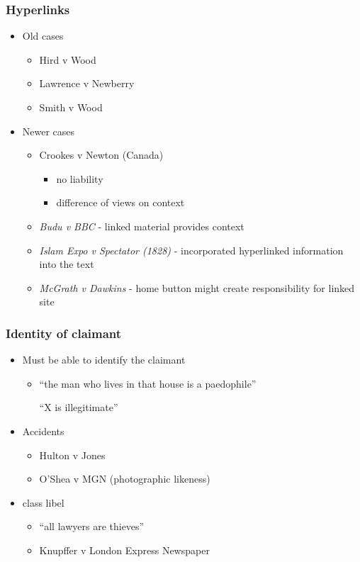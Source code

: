 \documentclass[ignorenonframetext,]{beamer}
\begin{document}

\begin{frame}
\frametitle{Hyperlinks}
\begin{itemize}
\item Old cases
  \begin{itemize}
  \item Hird v Wood
  \item Lawrence v Newberry
  \item Smith v Wood
  \end{itemize}
\item Newer cases
  \begin{itemize}
  \item Crookes v Newton (Canada)
    \begin{itemize}
    \item no liability
    \item difference of views on context
    \end{itemize}
  \item {\it Budu v BBC} - linked material provides context
  \item {\it Islam Expo v Spectator (1828)} - incorporated hyperlinked information into the text
  \item {\it McGrath v Dawkins} - home button might create responsibility for linked site
  \end{itemize}
\end{itemize}
\end{frame}

\begin{frame}
\frametitle{Identity of claimant}

\begin{itemize}
\item  Must be able to identify the claimant

  \begin{itemize}
  \item    ``the man who lives in that house is a paedophile''

    ``X is illegitimate''
  \end{itemize}
\item  Accidents
  \begin{itemize}
  \item    Hulton v Jones 
  \item    O'Shea v MGN (photographic likeness)
  \end{itemize}
\item  class libel 

  \begin{itemize}
  \item    ``all lawyers are thieves''
  \item    Knupffer v London Express Newspaper
  \end{itemize}
\end{itemize}


\end{frame}
\end{document}
